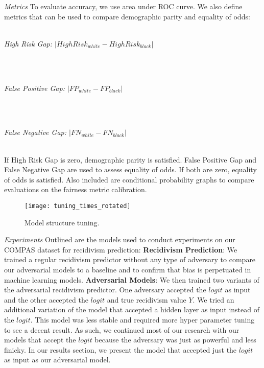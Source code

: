 \documentclass{article}
\begin{document}
\textit{Metrics} To evaluate accuracy, we use area under ROC curve. We also define metrics that can be used to compare demographic parity and equality of odds:
\\ \\
\vspace{-3mm}
\centerline{\textit{High Risk Gap: $|{High Risk_{white} - High Risk_{black}}|$}} \\ \\
\vspace{-3mm}
\centerline{\textit{False Positive Gap: $|{FP_{white} - FP_{black}}|$}} \\ \\
\vspace{-3mm}
\centerline{\textit{False Negative Gap: $|{FN_{white} - FN_{black}}|$}} \\

\vspace{-6mm}
If High Risk Gap is zero, demographic parity is satisfied. False Positive Gap and False Negative Gap are used to assess equality of odds. If both are zero, equality of odds is satisfied. Also included are conditional probability graphs to compare evaluations on the fairness metric calibration.

\begin{figure}
\begin{center}
\texttt{[image: tuning\_times\_rotated]}
\vspace{-5mm}
\caption{Model structure tuning.}
\label{num_layers}
\end{center}
\vspace{-5mm}
\end{figure}

\textit{Experiments} Outlined are the models used to conduct experiments on our COMPAS dataset for recidivism prediction:
\newline\textbf{Recidivism Prediction}:
We trained a regular recidivism predictor without any type of adversary to compare our adversarial models to a baseline and to confirm that bias is perpetuated in machine learning models.
\newline\textbf{Adversarial Models}:
We then trained two variants of the adversarial recidivism predictor. One adversary accepted the $logit$ as input and the other accepted the $logit$ and true recidivism value $Y$. We tried an additional variation of the model that accepted a hidden layer as input instead of the $logit$. This model was less stable and required more hyper parameter tuning to see a decent result. As such, we continued most of our research with our models that accept the $logit$ because the adversary was just as powerful and less finicky. In our results section, we present the model that accepted just the $logit$ as input as our adversarial model.
\end{document}
